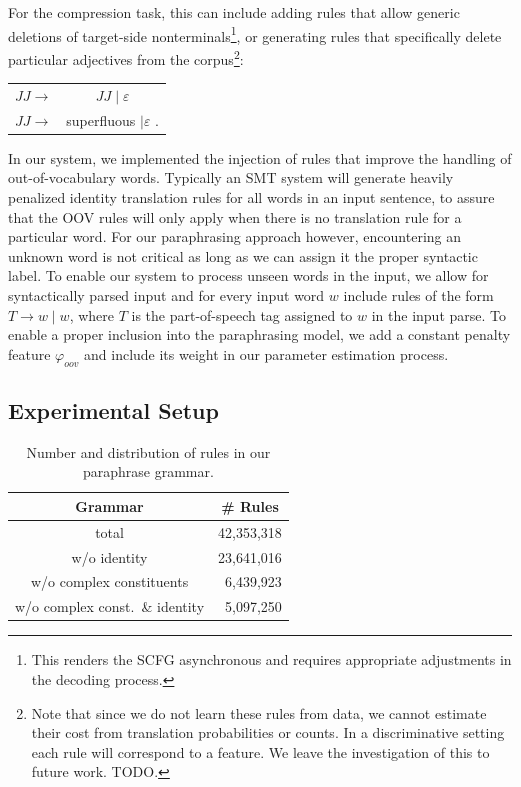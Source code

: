 \documentclass[11pt]{article}
\begin{document}
For the compression task, this can include adding rules that allow
generic deletions of target-side nonterminals\footnote{This renders
  the SCFG asynchronous and requires appropriate adjustments in the
  decoding process.}, or generating rules that specifically delete
particular adjectives from the corpus\footnote{Note that since we do
  not learn these rules from data, we cannot estimate their cost from
  translation probabilities or counts. In a discriminative setting
  each rule will correspond to a feature. We leave the investigation
  of this to future work. TODO.}:
\begin{center}
\begin{tabular}{cc}
 $\mathit{JJ} \rightarrow$ & $\mathit{JJ} \mid \varepsilon$ \\
 $\mathit{JJ} \rightarrow$ & superfluous $\mid \varepsilon$ . \\
\end{tabular}
\end{center}
In our system, we implemented the injection of rules that improve the
handling of out-of-vocabulary words. Typically an SMT system will
generate heavily penalized identity translation rules for all words in
an input sentence, to assure that the OOV rules will only apply when
there is no translation rule for a particular word. For our
paraphrasing approach however, encountering an unknown word is not
critical as long as we can assign it the proper syntactic label. To
enable our system to process unseen words in the input, we allow for
syntactically parsed input and for every input word $w$ include rules
of the form $\mathit{T} \rightarrow w \mid w$, where $T$ is the
part-of-speech tag assigned to $w$ in the input parse. To enable a
proper inclusion into the paraphrasing model, we add a constant
penalty feature $\varphi_{\mathit{oov}}$ and include its weight in our
parameter estimation process.

\subsection{Experimental Setup}
\label{setup}

\begin{table}
\begin{center}
\begin{tabular}{|c|r|}
  \hline
  Grammar & \multicolumn{1}{c|}{\# Rules} \\
  \hline
  total & 42,353,318 \\
  w/o identity & 23,641,016 \\
  w/o complex constituents & 6,439,923 \\
  w/o complex const.\ \& identity & 5,097,250 \\
  \hline
\end{tabular}
\end{center}
\caption{Number and distribution of rules in our paraphrase grammar.}
\label{grammar_stats}
\end{table}
\end{document}

